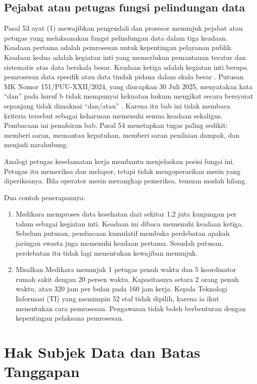 \subsection*{Pejabat atau petugas fungsi pelindungan data}

Pasal 53 ayat (1) mewajibkan pengendali dan prosesor menunjuk pejabat atau petugas yang melaksanakan
fungsi pelindungan data dalam tiga keadaan. Keadaan pertama adalah pemrosesan untuk kepentingan
pelayanan publik. Keadaan kedua adalah kegiatan inti yang memerlukan pemantauan teratur dan
sistematis atas data berskala besar. Keadaan ketiga adalah kegiatan inti berupa pemrosesan data
spesifik atau data tindak pidana dalam skala besar \cite{uu27-2022-pdp}. Putusan MK Nomor
151/PUU-XXII/2024, yang diucapkan 30 Juli 2025, menyatakan kata ``dan'' pada huruf b tidak mempunyai
kekuatan hukum mengikat secara bersyarat sepanjang tidak dimaknai ``dan/atau'' \cite{c07-mk151}.
Karena itu bab ini tidak membaca kriteria tersebut sebagai keharusan memenuhi semua keadaan
sekaligus. Pembacaan ini penafsiran bab. Pasal 54 menetapkan tugas paling sedikit: memberi saran,
memantau kepatuhan, memberi saran penilaian dampak, dan menjadi narahubung.

Analogi petugas keselamatan kerja membantu menjelaskan posisi fungsi ini. Petugas itu memeriksa dan
melapor, tetapi tidak mengoperasikan mesin yang diperiksanya. Bila operator mesin merangkap
pemeriksa, temuan mudah hilang.

Dua contoh penerapannya:
\begin{enumerate}
  \item Medikara memproses data kesehatan dari sekitar 1,2 juta kunjungan per tahun sebagai kegiatan
  inti. Keadaan ini dibaca memenuhi keadaan ketiga. Sebelum putusan, pembacaan kumulatif membuka
  perdebatan apakah jaringan swasta juga memenuhi keadaan pertama. Sesudah putusan, perdebatan itu
  tidak lagi menentukan kewajiban menunjuk.
  \item Misalkan Medikara menunjuk 1 petugas penuh waktu dan 5 koordinator rumah sakit dengan 20
  persen waktu. Kapasitasnya setara 2 orang penuh waktu, atau 320 jam per bulan pada 160 jam kerja.
  Kepala Teknologi Informasi (TI) yang memimpin 52 staf tidak dipilih, karena ia ikut menentukan
  cara pemrosesan. Pengawasan tidak boleh berbenturan dengan kepentingan pelaksana pemrosesan.
\end{enumerate}

\section{Hak Subjek Data dan Batas Tanggapan}

